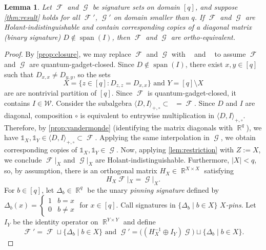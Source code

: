 \documentclass{article}
\newtheorem{lemma}{Lemma}[section]
\theoremstyle{remark}
\theoremstyle{definition}
\DeclareMathOperator{\spn}{span}
\DeclareMathOperator{\rr}{\mathbb{R}}
\DeclareMathOperator{\fc}{\mathcal{F}}
\DeclareMathOperator{\gc}{\mathcal{G}}
\DeclareMathOperator{\ofc}{\overline{\fc}}
\DeclareMathOperator{\ogc}{\overline{\gc}}
\begin{document}
\begin{lemma}
    \label{lem:induction}
    Let $\fc$ and $\gc$ be signature sets on domain $[q]$, and suppose \autoref{thm:result} holds for
    all $\fc'$, $\gc'$ on domain smaller than $q$. If $\fc$ and $\gc$ are Holant-indistinguishable
    and contain corresponding copies of a diagonal matrix (binary signature)
    $D \not\in \spn(I)$, then $\fc$ and $\gc$ are ortho-equivalent. 
\end{lemma}
\begin{proof}
    By \autoref{prop:closure}, we may replace $\fc$ and $\gc$ with $\ofc$ and $\ogc$ to assume $\fc$
    and $\gc$ are quantum-gadget-closed.
    Since $D \not\in \spn(I)$, there exist $x,y \in [q]$ such that $D_{x,x} \neq D_{y,y}$,
    so the sets 
    \[
        X = \{z \in [q]: D_{z,z} = D_{x,x}\} \text{ and } Y = [q] \setminus X
    \]
    are are nontrivial partition of $[q]$. Since $\fc$ is quantum-gadget-closed, it contains 
    $I \in \mathcal{W}$. Consider the subalgebra $\langle D,I\rangle_{+,\circ} \subset \ofc = \fc$.
    Since $D$ and $I$ are diagonal, composition $\circ$ is equivalent to entrywise multiplication
    in $\langle D,I\rangle_{+,\circ}$. Therefore, by \autoref{prop:vandermonde} (identifying the
    matrix diagonals with $\rr^q$),
    we have $\mathds{1}_X, \mathds{1}_Y \in\langle D,I\rangle_{+,\circ} \subset \fc$.
    Applying the same interpolation in $\gc$, we obtain corresponding copies of 
    $\mathds{1}_X, \mathds{1}_Y \in \gc$. 
    Now, applying \autoref{lem:restriction} with $Z := X$, we conclude
    $\fc|_X$ and $\gc|_X$ are Holant-indistinguishable. Furthermore, $|X| < q$, so, by assumption,
    there is an orthogonal matrix $H_X \in \rr^{X \times X}$ satisfying 
    \begin{equation}
        H_X \fc|_X = \gc|_X.
        \label{eq:hx}
    \end{equation}
    For $b \in [q]$, let $\Delta_b \in \rr^q$ be the unary \emph{pinning signature} defined by $\Delta_b(x) = 
    \begin{cases} 1 & b = x \\ 0 & b \neq x \end{cases}$ for $x \in [q]$. 
    Call signatures in $\{\Delta_b \mid b \in X\}$ \emph{$X$-pins}.
    Let $I_Y$ be the identity operator on $\rr^{Y\times Y}$ and define
    \begin{equation}
        \fc' = \fc \sqcup \{\Delta_b \mid b \in X\} \text{ and } \gc' = \big((H_X^{-1} \oplus I_Y)\gc\big) \sqcup
        \{\Delta_b \mid b \in X\}.
        \label{eq:fcprime}

\end{equation}
\end{proof}
\end{document}
